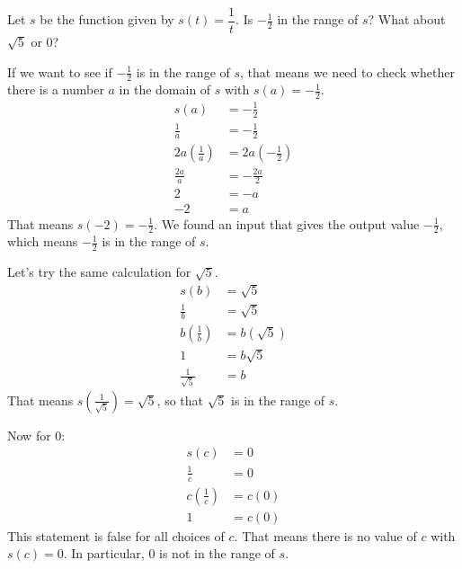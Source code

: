 \documentclass[nooutcomes]{ximera}
\begin{document}
	
	\begin{example}

		Let $s$ be the function given by $s(t) = \dfrac{1}{t}$. Is $-\frac{1}{2}$ in the range of $s$? What about $\sqrt{5}$ or $0$?

		\begin{explanation}
		
			If we want to see if $-\frac{1}{2}$ is in the range of $s$, that means we need to check whether there is a number $a$ in the domain
			of $s$ with $s(a) = -\frac{1}{2}$. 
			\begin{align*}
				s(a) &= -\frac{1}{2}\\
				\frac{1}{a} &= -\frac{1}{2}\\
				2a \left( \frac{1}{a} \right) &= 2a \left( - \frac{1}{2} \right)\\
				\frac{2a}{a} &= -\frac{2a}{2}\\
				2 &= -a \\			
				-2 &= a
			\end{align*}
			That means $s(-2) = -\frac{1}{2}$. We found an input that gives the output value $-\frac{1}{2}$, which means $-\frac{1}{2}$ is in 
			the range of $s$.

			Let's try the same calculation for $\sqrt{5}$.
			\begin{align*}
				s(b) &= \sqrt{5}\\
				\frac{1}{b} &= \sqrt{5}\\
				b \left( \frac{1}{b} \right) &= b \left( \sqrt{5} \right)\\
				1 &= b\sqrt{5}\\
				\frac{1}{\sqrt{5}} &= b
			\end{align*}
			That means $s\left(\frac{1}{\sqrt{5}} \right) = \sqrt{5}$, so that $\sqrt{5}$ is in the range of $s$.
				
			Now for $0$:
			\begin{align*}
				s(c) &= 0\\
				\frac{1}{c} &= 0\\
				c \left( \frac{1}{c} \right) &= c \left( 0 \right)\\
				1 &= c(0)
			\end{align*}
			This statement is false for all choices of $c$. That means there is no value of $c$ with $s(c)=0$. In particular, $0$ is not in the range of $s$.	
		\end{explanation}
	\end{example}
\end{document}
